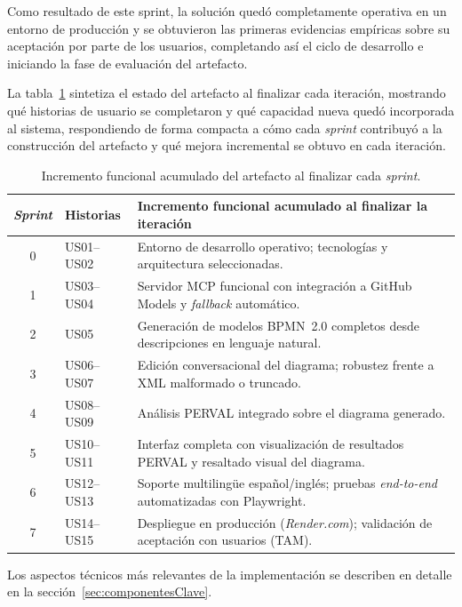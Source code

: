 Como resultado de este sprint, la solución quedó completamente operativa en un entorno de producción y se obtuvieron las primeras evidencias empíricas sobre su aceptación por parte de los usuarios, completando así el ciclo de desarrollo e iniciando la fase de evaluación del artefacto.

La tabla~\ref{tab:incrementoSprints} sintetiza el estado del artefacto al finalizar cada iteración, mostrando qué historias de usuario se completaron y qué capacidad nueva quedó incorporada al sistema, respondiendo de forma compacta a cómo cada \textit{sprint} contribuyó a la construcción del artefacto y qué mejora incremental se obtuvo en cada iteración.

\begin{table}[H]
\centering
\small
\begin{tabular}{|c|l|p{8.3cm}|}
\hline
\rowcolor{gray!20} \textbf{\textit{Sprint}} & \textbf{Historias} & \textbf{Incremento funcional acumulado al finalizar la iteración} \\
\hline
0 & US01--US02 & Entorno de desarrollo operativo; tecnologías y arquitectura seleccionadas. \\
\hline
1 & US03--US04 & Servidor MCP funcional con integración a GitHub Models y \textit{fallback} automático. \\
\hline
2 & US05 & Generación de modelos BPMN~2.0 completos desde descripciones en lenguaje natural. \\
\hline
3 & US06--US07 & Edición conversacional del diagrama; robustez frente a XML malformado o truncado. \\
\hline
4 & US08--US09 & Análisis PERVAL integrado sobre el diagrama generado. \\
\hline
5 & US10--US11 & Interfaz completa con visualización de resultados PERVAL y resaltado visual del diagrama. \\
\hline
6 & US12--US13 & Soporte multilingüe español/inglés; pruebas \textit{end-to-end} automatizadas con Playwright. \\
\hline
7 & US14--US15 & Despliegue en producción (\textit{Render.com}); validación de aceptación con usuarios (TAM). \\
\hline
\end{tabular}
\caption{Incremento funcional acumulado del artefacto al finalizar cada \textit{sprint}.}
\label{tab:incrementoSprints}
\end{table}


Los aspectos técnicos más relevantes de la implementación se describen en detalle en la sección~\ref{sec:componentesClave}.


